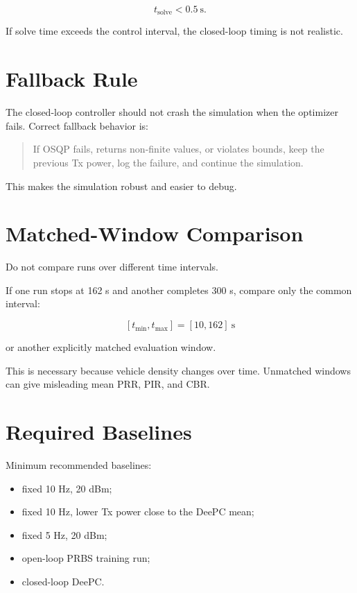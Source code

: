 \documentclass[11pt]{article}
\begin{document}
\[
t_{\mathrm{solve}} < 0.5~\mathrm{s}.
\]

If solve time exceeds the control interval, the closed-loop timing is not realistic.

\section{Fallback Rule}

The closed-loop controller should not crash the simulation when the optimizer fails. Correct fallback behavior is:

\begin{quote}
If OSQP fails, returns non-finite values, or violates bounds, keep the previous Tx power, log the failure, and continue the simulation.
\end{quote}

This makes the simulation robust and easier to debug.

\section{Matched-Window Comparison}

Do not compare runs over different time intervals.

If one run stops at 162 s and another completes 300 s, compare only the common interval:

\[
[t_{\min},t_{\max}] = [10,162]~\mathrm{s}
\]

or another explicitly matched evaluation window.

This is necessary because vehicle density changes over time. Unmatched windows can give misleading mean PRR, PIR, and CBR.

\section{Required Baselines}

Minimum recommended baselines:

\begin{itemize}
    \item fixed 10 Hz, 20 dBm;
    \item fixed 10 Hz, lower Tx power close to the DeePC mean;
    \item fixed 5 Hz, 20 dBm;
    \item open-loop PRBS training run;
    \item closed-loop DeePC.
\end{itemize}
\end{document}
